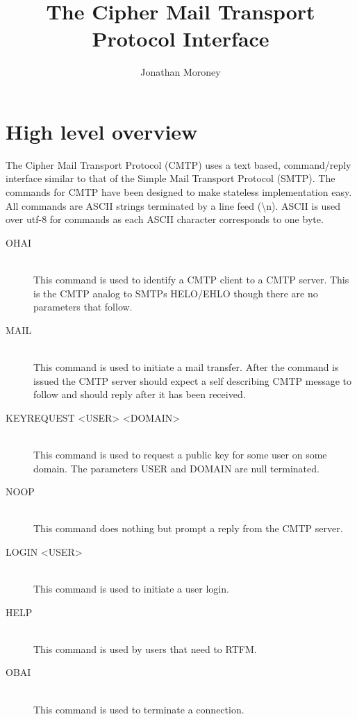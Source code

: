 \documentclass[a4paper,11pt]{article}
\title{The Cipher Mail Transport Protocol Interface}
\author{Jonathan Moroney}
\begin{document}
\maketitle
\tableofcontents


\section{High level overview}
The Cipher Mail Transport Protocol (CMTP) uses a text based, command/reply interface similar to that of the Simple Mail Transport Protocol (SMTP). The commands for CMTP have been designed to make stateless implementation easy. All commands are ASCII strings terminated by a line feed (\textbackslash n). ASCII is used over utf-8 for commands as each ASCII character corresponds to one byte.

\begin{description}
  \item [OHAI] \hfill \\
  This command is used to identify a CMTP client to a CMTP server. This is the CMTP analog to SMTPs HELO/EHLO though there are no parameters that follow.
  \item [MAIL] \hfill \\
  This command is used to initiate a mail transfer. After the command is issued the CMTP server should expect a self describing CMTP message to follow and should reply after it has been received.
  \item [KEYREQUEST <USER> <DOMAIN>] \hfill \\
  This command is used to request a public key for some user on some domain. The parameters USER and DOMAIN are null terminated.
  \item [NOOP] \hfill \\
  This command does nothing but prompt a reply from the CMTP server.
  \item [LOGIN <USER>] \hfill \\
  This command is used to initiate a user login.
  \item [HELP] \hfill \\
  This command is used by users that need to RTFM.
  \item [OBAI] \hfill \\
  This command is used to terminate a connection.
\end{description}
\end{document}

